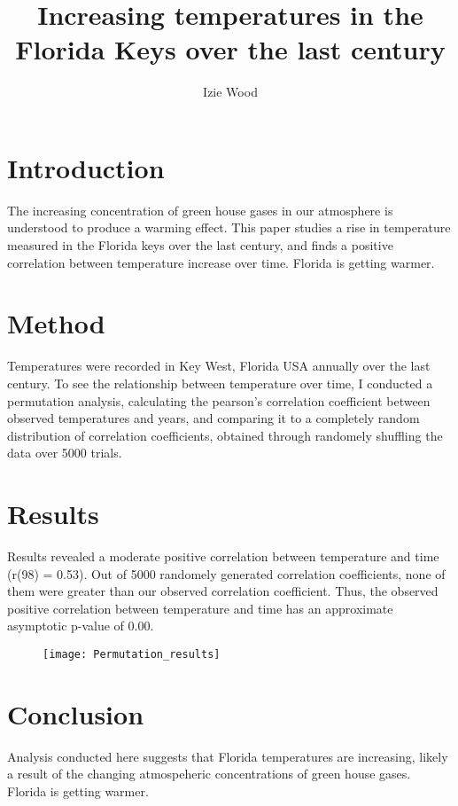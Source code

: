 \documentclass[11pt]{article}
\title{\vspace{-3cm}\Large Increasing temperatures in the Florida Keys over the last century}
\author{\vspace{-1cm}\normalsize Izie Wood}
\date{\normalsize}
\begin{document}
\maketitle{\large}
\vspace{-1cm}
\section{Introduction}
        The  increasing concentration of green house gases
    in our atmosphere is understood to produce a warming effect. This paper studies a rise in temperature measured in the Florida keys 
    over the last century, and finds a positive correlation between temperature increase
    over time. Florida is getting warmer. 
\section{Method}
        Temperatures were recorded in Key West, Florida USA annually over the last century. 
    To see the relationship between temperature over time, I conducted a permutation analysis, calculating the 
    pearson's correlation coefficient between observed temperatures and years, and comparing 
    it to a completely random distribution of correlation coefficients, obtained through
    randomely shuffling the data over 5000 trials. 
\section{Results}
            Results revealed a moderate positive correlation between temperature and time
        (r(98) = 0.53). Out of 5000 randomely generated correlation coefficients, none of them were 
        greater than our observed correlation coefficient. Thus, the observed positive correlation between temperature and time has an 
        approximate asymptotic p-value of 0.00.   
        \begin{figure}[ht]
        \begin{center}
            \texttt{[image: Permutation\_results]}
        \end{center}
        \end{figure}
\section{Conclusion}
    Analysis conducted here suggests that Florida temperatures are increasing, likely
    a result of the changing atmospeheric concentrations of green house gases. Florida is 
    getting warmer.
\end{document}
